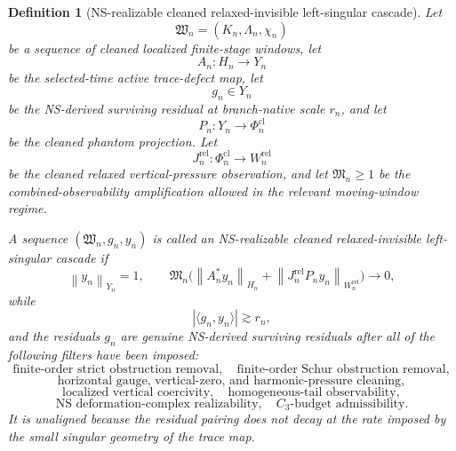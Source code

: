 \documentclass[11pt]{article}
\numberwithin{equation}{section}
\newtheorem{definition}[theorem]{Definition}
\newcommand{\norm}[2]{\left\|#1\right\|_{#2}}
\begin{document}
\begin{definition}[NS-realizable cleaned relaxed-invisible left-singular cascade]
Let
\[
        \mathfrak W_n=(K_n,\Lambda_n,\chi_n)
\]
be a sequence of cleaned localized finite-stage windows, let
\[
        A_n:H_n\to Y_n
\]
be the selected-time active trace-defect map, let
\[
        g_n\in Y_n
\]
be the NS-derived surviving residual at branch-native scale \(r_n\), and let
\[
        P_n:Y_n\to \Phi_n^{\mathrm{cl}}
\]
be the cleaned phantom projection.  Let
\[
        J_n^{\mathrm{rel}}:\Phi_n^{\mathrm{cl}}\to W_n^{\mathrm{rel}}
\]
be the cleaned relaxed vertical-pressure observation, and let \(\mathfrak M_n\ge1\) be the combined-observability amplification allowed in the relevant moving-window regime.

A sequence \((\mathfrak W_n,g_n,y_n)\) is called an \emph{NS-realizable cleaned relaxed-invisible
left-singular cascade} if
\[
        \norm{y_n}{Y_n}=1,
        \qquad
        \mathfrak M_n\Big(
        \norm{A_n^*y_n}{H_n}
        +
        \norm{J_n^{\mathrm{rel}}P_ny_n}{W_n^{\mathrm{rel}}}
        \Big)\to0,
\]
while
\[
        |\langle g_n,y_n\rangle|\gtrsim r_n,
\]
and the residuals \(g_n\) are genuine NS-derived surviving residuals after all of the following
filters have been imposed:
\[
\text{finite-order strict obstruction removal},
\quad
\text{finite-order Schur obstruction removal},
\]
\[
\text{horizontal gauge, vertical-zero, and harmonic-pressure cleaning},
\]
\[
\text{localized vertical coercivity},
\quad
\text{homogeneous-tail observability},
\]
\[
\text{NS deformation-complex realizability},
\quad
C_3\text{-budget admissibility}.
\]
It is \emph{unaligned} because the residual pairing does not decay at the rate imposed by the
small singular geometry of the trace map.
\end{definition}
\end{document}
